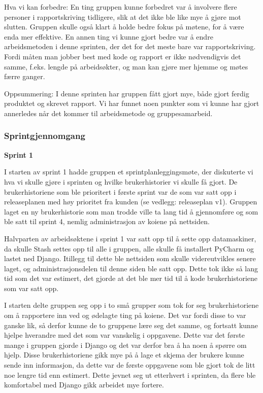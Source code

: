 \documentclass[12pt,a4paper,norsk]{article}
\begin{document}
Hva vi kan forbedre:
En ting gruppen kunne forbedret var å involvere flere personer i rapportskriving tidligere, slik at det ikke ble like mye å gjøre mot slutten. 
Gruppen skulle også klart å holde bedre fokus på møtene, for å være enda mer effektive. 
En annen ting vi kunne gjort bedre var å endre arbeidsmetoden i denne sprinten, der det for det meste bare var rapportskriving. Fordi måten man jobber best med kode og rapport er ikke nødvendigvis det samme, f.eks. lengde på arbeidsøkter, og man kan gjøre mer hjemme og møtes færre ganger. 

Oppsummering:  
I denne sprinten har gruppen fått gjort mye, både gjort ferdig produktet og skrevet rapport. Vi har funnet noen punkter som vi kunne har gjort annerledes når det kommer til arbeidsmetode og gruppesamarbeid. 

	\subsubsection{Sprintgjennomgang}
\bigskip \noindent \textbf{Sprint 1}
\par I starten av sprint 1 hadde gruppen et sprintplanleggingsmøte, der diskuterte vi hva vi skulle gjøre i sprinten og hvilke brukerhistorier vi skulle få gjort. De brukerhistoriene som ble prioritert i første sprint var de som var satt opp i releaseplanen med høy prioritet fra kunden (se vedlegg: releaseplan v1). Gruppen laget en ny brukerhistorie som man trodde ville ta lang tid å gjennomføre og som ble satt til sprint 4, nemlig administrasjon av koiene på nettsiden. 

Halvparten av arbeidsøktene i sprint 1 var satt opp til å sette opp datamaskiner, da skulle Stash settes opp til alle i gruppen, alle skulle få installert PyCharm og lastet ned Django. Itillegg til dette ble nettsiden som skulle videreutvikles senere laget, og administrasjonsdelen til denne siden ble satt opp. Dette tok ikke så lang tid som det var estimert, det gjorde at det ble mer tid til å kode brukerhistoriene som var satt opp. 

I starten delte gruppen seg opp i to små grupper som tok for seg brukerhistoriene om å rapportere inn ved og ødelagte ting på koiene. Det var fordi disse to var ganske lik, så derfor kunne de to gruppene lære seg det samme, og fortsatt kunne hjelpe hverandre med det som var vanskelig i oppgavene. Dette var det første mange i gruppen gjorde i Django og det var derfor bra å ha noen å spørre om hjelp. Disse brukerhistoriene gikk mye på å lage et skjema der brukere kunne sende inn informasjon, da dette var de første oppgavene som ble gjort tok de litt noe lengre tid enn estimert. Dette jevnet seg ut etterhvert i sprinten, da flere ble komfortabel med Django gikk arbeidet mye fortere. 
\end{document}
